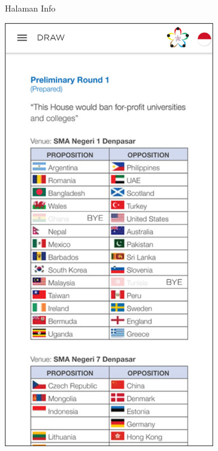 \begin{figure}[H]
\begin{subfigure}[b]{0.247\textwidth}
	    \caption{Halaman Info}
	    \label{fig:wsdcAppInfo}
     \end{subfigure}
	\begin{subfigure}[b]{0.247\textwidth}
    \centering
	    \includegraphics[scale=0.4]{Gambar/DrawPage.png}

\end{subfigure}
\end{figure}
